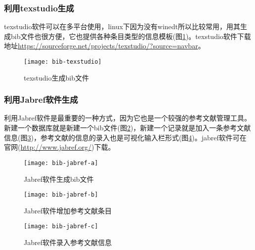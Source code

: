 \documentclass[twoside]{article} %
\begin{document}
\subsubsection{利用texstudio生成}
texstudio软件可以在多平台使用，linux下因为没有winedt所以比较常用，用其生成bib文件也很方便，它也提供各种条目类型的信息模板(图\ref{bib:texstudio})。texstudio软件下载地址\url{https://sourceforge.net/projects/texstudio/?source=navbar}。

\begin{figure}[!htb]
  \centering
  \texttt{[image: bib-texstudio]}
  \caption{texstudio生成bib文件}\label{bib:texstudio}
\end{figure}

\subsubsection{利用Jabref软件生成}
利用Jabref软件是最重要的一种方式，因为它也是一个较强的参考文献管理工具。新建一个数据库就是新建一个bib文件(图\ref{bib:jabref-a})，新建一个记录就是加入一条参考文献信息(图\ref{bib:jabref-b})，参考文献的信息的录入也是可视化输入栏形式(图\ref{bib:jabref-c})。jabref软件可在官网(\url{http://www.jabref.org/})下载。

\begin{figure}[!htb]
  \centering
  \texttt{[image: bib-jabref-a]}
  \caption{Jabref软件生成bib文件}\label{bib:jabref-a}
\end{figure}

\begin{figure}[!htb]
  \centering
  \texttt{[image: bib-jabref-b]}
  \caption{Jabref软件增加参考文献条目}\label{bib:jabref-b}
\end{figure}

\begin{figure}[!htb]
  \centering
  \texttt{[image: bib-jabref-c]}
  \caption{Jabref软件录入参考文献信息}\label{bib:jabref-c}
\end{figure}
\end{document}
